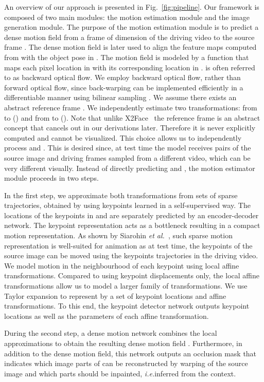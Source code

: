 \documentclass{article}
\def\ie{\textit{i.e.}}
\def\etal{\textit{et al.}}
\begin{document}
An overview of our approach is presented in Fig.~\ref{fig:pipeline}. Our framework is composed of two main modules: the motion estimation module and the image generation module.
The purpose of the motion estimation module is to predict a dense motion field from a frame  of dimension  of the driving video  to the source frame . The dense motion field is later used to align the feature maps computed from  with the object pose in . The motion field is modeled by a function  that maps each pixel location in  with its corresponding location in .  is often referred to as backward optical flow. We employ backward optical flow, rather than forward optical flow, since back-warping can be implemented efficiently in a differentiable manner using bilinear sampling \cite{jaderberg2015spatial}.
We assume there exists an abstract reference frame . We independently estimate two transformations: from  to   () and from  to  (). Note that unlike X2Face~\cite{wiles2018x2face} the reference frame is an abstract concept that cancels out in our derivations later. Therefore it is never explicitly computed and cannot be visualized. This choice allows us to independently process  and . This is desired since, at test time the model receives pairs of the source image and driving frames sampled from a different video, which can be very different visually. Instead of directly predicting  and , the motion estimator module proceeds in two steps. 

In the first step, we approximate both transformations from sets of sparse trajectories, obtained by using keypoints learned in a self-supervised way. The locations of the keypoints in  and  are separately predicted by an encoder-decoder network. The keypoint representation acts as a bottleneck resulting in a compact motion representation. As shown by Siarohin \etal~\cite{siarohin2018animating}, such sparse motion representation is well-suited for animation as at test time, the keypoints of the source image can be moved using the keypoints trajectories in the driving video. 
We model motion in the neighbourhood of each keypoint using local affine transformations. Compared to using keypoint displacements only, the local affine transformations allow us to model a larger family of transformations. We use Taylor expansion to represent  by a set of keypoint locations and affine transformations. To this end, the keypoint detector network outputs keypoint locations as well as the parameters of each affine transformation. 

During the second step, a dense motion network combines the local approximations to obtain the resulting dense motion field . Furthermore, in addition to the dense motion field, this network outputs an occlusion mask  that indicates which image parts of  can be reconstructed by warping of the source image and which parts should be inpainted, \ie inferred from the context.
\end{document}
